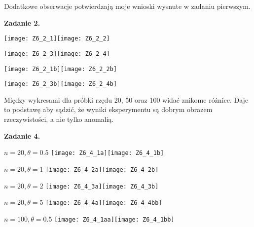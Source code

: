 \documentclass[a4paper]{article}
\begin{document}
Dodatkowe obserwacje potwierdzają moje wnioski wysnute w zadaniu pierwszym.
\newline

\textbf{Zadanie 2.}

\begin{center}
\texttt{[image: Z6\_2\_1]}\texttt{[image: Z6\_2\_2]}
\end{center}

\begin{center}
\texttt{[image: Z6\_2\_3]}\texttt{[image: Z6\_2\_4]} 
\end{center}

\begin{center}
\texttt{[image: Z6\_2\_1b]}\texttt{[image: Z6\_2\_2b]}
\end{center}

\begin{center}
\texttt{[image: Z6\_2\_3b]}\texttt{[image: Z6\_2\_4b]} 
\end{center}

Między wykresami dla próbki rzędu 20, 50 oraz 100 widać znikome różnice. Daje to podstawę aby sądzić, że wyniki eksperymentu są dobrym obrazem rzeczywistości, a nie tylko anomalią.
\newline

\textbf{Zadanie 4.}

\begin{center}
$n=20,\theta=0.5$
\texttt{[image: Z6\_4\_1a]}\texttt{[image: Z6\_4\_1b]} 
\end{center}
\newpage

\begin{center}
$n=20,\theta=1$
\texttt{[image: Z6\_4\_2a]}\texttt{[image: Z6\_4\_2b]} 
\end{center}

\begin{center}
$n=20,\theta=2$
\texttt{[image: Z6\_4\_3a]}\texttt{[image: Z6\_4\_3b]} 
\end{center}

\begin{center}
$n=20,\theta=5$
\texttt{[image: Z6\_4\_4a]}\texttt{[image: Z6\_4\_4bb]} 
\end{center}
\newpage

\begin{center}
$n=100,\theta=0.5$
\texttt{[image: Z6\_4\_1aa]}\texttt{[image: Z6\_4\_1bb]} 
\end{center}
\end{document}

